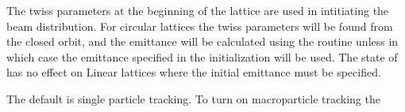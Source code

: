{The twiss parameters at the beginning of the lattice are used in
intitiating the beam distribution.  For circular lattices the twiss
parameters will be found from the closed orbit, and the emittance will
be calculated using the \bmad routine  unless
 in which case the emittance specified in the
initialization will be used. The state of  has no
effect on Linear lattices where the initial emittance must be
specified.

The default is single particle tracking. To turn on macroparticle
tracking the \vn{global%
This can be placed in the \vn{tao_params} namelist above, for example,
\begin{example}
  &tao_params
    n_v1_var_max  = 5
    n_d2_data_max = 6
    n_data_max    = 2000
    n_var_max     = 2000
    global%
    global%
  /
\end{example}

\section{Initializing Variables}\index{Initialization!Variables}
\label{s:init_var} 

}}
